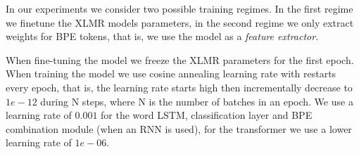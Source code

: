 \documentclass[11pt]{article}
\newcommand\jp[1]{(\textbf{JP:} #1)}
\begin{document}
	
         In our experiments we consider two possible training
     regimes. In the first regime we finetune the XLMR models
     parameters, in the second regime we only extract weights for BPE
     tokens, that is, we use the model as a \emph{feature extractor}.
     
            	When fine-tuning the model we freeze the XLMR
     parameters for the first epoch.  When training the model we use
     cosine annealing learning rate with restarts every epoch, that
     is, the learning rate starts high then incrementally decrease to
     $1e-12$ during N steps, where N is the number of batches in an
     epoch. We use a learning rate of $0.001$ for the word LSTM,
     classification layer and BPE combination module (when an RNN is
     used), for the transformer we use a lower learning rate of
     $1e-06$.

   
\end{document}

